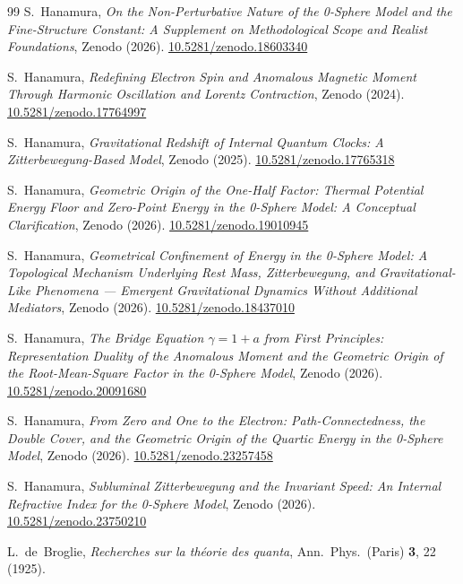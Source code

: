 \documentclass[%
 reprint, amsmath,amssymb, aps, prb, ]{revtex4-2}
\numberwithin{equation}{section}
\begin{document}
\begin{thebibliography}{99}
S.~Hanamura, \textit{On the Non-Perturbative Nature of the 0-Sphere Model and the Fine-Structure Constant: A Supplement on Methodological Scope and Realist Foundations}, Zenodo (2026). \href{https://doi.org/10.5281/zenodo.18603340}{10.5281/zenodo.18603340}

S.~Hanamura, \textit{Redefining Electron Spin and Anomalous Magnetic Moment Through Harmonic Oscillation and Lorentz Contraction}, Zenodo (2024). \href{https://doi.org/10.5281/zenodo.17764997}{10.5281/zenodo.17764997}

S.~Hanamura, \textit{Gravitational Redshift of Internal Quantum Clocks: A Zitterbewegung-Based Model}, Zenodo (2025). \href{https://doi.org/10.5281/zenodo.17765318}{10.5281/zenodo.17765318}

S.~Hanamura, \textit{Geometric Origin of the One-Half Factor: Thermal Potential Energy Floor and Zero-Point Energy in the 0-Sphere Model: A Conceptual Clarification}, Zenodo (2026). \href{https://doi.org/10.5281/zenodo.19010945}{10.5281/zenodo.19010945}

S.~Hanamura, \textit{Geometrical Confinement of Energy in the 0-Sphere Model: A Topological Mechanism Underlying Rest Mass, Zitterbewegung, and Gravitational-Like Phenomena --- Emergent Gravitational Dynamics Without Additional Mediators}, Zenodo (2026). \href{https://doi.org/10.5281/zenodo.18437010}{10.5281/zenodo.18437010}

S.~Hanamura, \textit{The Bridge Equation $\gamma = 1 + a$ from First Principles: Representation Duality of the Anomalous Moment and the Geometric Origin of the Root-Mean-Square Factor in the 0-Sphere Model}, Zenodo (2026). \href{https://doi.org/10.5281/zenodo.20091680}{10.5281/zenodo.20091680}

S.~Hanamura, \textit{From Zero and One to the Electron: Path-Connectedness, the Double Cover, and the Geometric Origin of the Quartic Energy in the 0-Sphere Model}, Zenodo (2026). \href{https://doi.org/10.5281/zenodo.23257458}{10.5281/zenodo.23257458}

S.~Hanamura, \textit{Subluminal Zitterbewegung and the Invariant Speed: An Internal Refractive Index for the 0-Sphere Model}, Zenodo (2026). \href{https://doi.org/10.5281/zenodo.23750210}{10.5281/zenodo.23750210}

L.~de~Broglie, \textit{Recherches sur la th\'eorie des quanta}, Ann.\ Phys.\ (Paris) \textbf{3}, 22 (1925).


\end{thebibliography}
\end{document}
